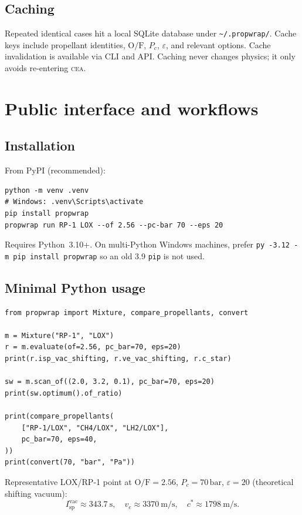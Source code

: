 \documentclass[11pt,a4paper]{report}
\newcommand{\cea}{\textsc{cea}}
\newcommand{\of}{\mathrm{O/F}}
\newcommand{\Isp}{I_{\mathrm{sp}}}
\newcommand{\cstar}{c^{*}}
\newcommand{\ve}{v_{e}}
\newcommand{\Pc}{P_{c}}
\newcommand{\eps}{\varepsilon}
\begin{document}
\section{Caching}

Repeated identical cases hit a local SQLite database under
\texttt{\textasciitilde/.propwrap/}. Cache keys include propellant identities,
$\of$, $\Pc$, $\eps$, and relevant options. Cache invalidation is available via
CLI and API. Caching never changes physics; it only avoids re-entering \cea{}.

\chapter{Public interface and workflows}
\label{ch:api}

\section{Installation}

From PyPI (recommended):
\begin{lstlisting}
python -m venv .venv
# Windows: .venv\Scripts\activate
pip install propwrap
propwrap run RP-1 LOX --of 2.56 --pc-bar 70 --eps 20
\end{lstlisting}

Requires Python~3.10+. On multi-Python Windows machines, prefer
\texttt{py -3.12 -m pip install propwrap} so an old 3.9 \texttt{pip} is not used.

\section{Minimal Python usage}

\begin{lstlisting}
from propwrap import Mixture, compare_propellants, convert

m = Mixture("RP-1", "LOX")
r = m.evaluate(of=2.56, pc_bar=70, eps=20)
print(r.isp_vac_shifting, r.ve_vac_shifting, r.c_star)

sw = m.scan_of((2.0, 3.2, 0.1), pc_bar=70, eps=20)
print(sw.optimum().of_ratio)

print(compare_propellants(
    ["RP-1/LOX", "CH4/LOX", "LH2/LOX"],
    pc_bar=70, eps=40,
))
print(convert(70, "bar", "Pa"))
\end{lstlisting}

Representative LOX/RP-1 point at $\of=2.56$, $\Pc=70\,\mathrm{bar}$,
$\eps=20$ (theoretical shifting vacuum):
\begin{equation}
  \Isp^{\mathrm{vac}} \approx \SI{343.7}{\second},\quad
  \ve \approx \SI{3370}{\metre\per\second},\quad
  \cstar \approx \SI{1798}{\metre\per\second}.
  \label{eq:kerolox_demo}
\end{equation}
\end{document}
